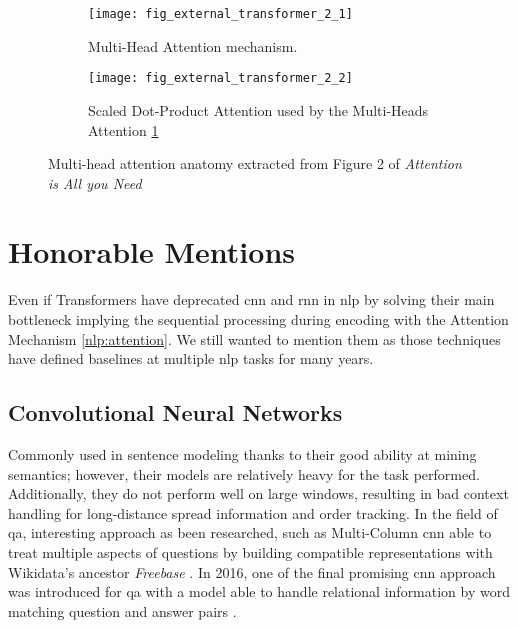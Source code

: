 \begin{figure}
	\begin{subfigure}{.5\textwidth}
		\centering
		\texttt{[image: fig\_external\_transformer\_2\_1]}
		\caption{Multi-Head Attention mechanism.}
		\label{fig:fig_external_transformer_2_1}
	\end{subfigure}
	\hfill
	\begin{subfigure}{.5\textwidth}
		\centering
		\texttt{[image: fig\_external\_transformer\_2\_2]}
    	\caption{Scaled Dot-Product Attention used by the Multi-Heads Attention \ref{fig:fig_external_transformer_2_1}}
    	\label{fig:fig_external_transformer_2_2}
	\end{subfigure}
	\caption{Multi-head attention anatomy extracted from Figure 2 of \textit{Attention is All you Need} \autocite{paper:journals/corr/VaswaniSPUJGKP17}}
	\label{fig:fig_external_transformer_2}
\end{figure}


\section{Honorable Mentions}
Even if Transformers have deprecated \gls{cnn} and \gls{rnn} in \gls{nlp} by solving their main bottleneck implying the sequential processing during encoding with the Attention Mechanism \ref{nlp:attention}. We still wanted to mention them as those techniques have defined baselines at multiple \gls{nlp} tasks for many years.

\subsection{Convolutional Neural Networks}
Commonly used in sentence modeling thanks to their good ability at mining semantics; however, their models are relatively heavy for the task performed. Additionally, they do not perform well on large windows, resulting in bad context handling for long-distance spread information and order tracking. In the field of \gls{qa}, interesting approach as been researched, such as Multi-Column \gls{cnn} \autocite{paper:Dong2015} able to treat multiple aspects of questions by building compatible representations with Wikidata's ancestor \textit{Freebase} \autocite{paper:bollacker2008}. In 2016, one of the final promising \gls{cnn} approach was introduced for \gls{qa} with a model able to handle relational information by word matching question and answer pairs \autocite{paper:Severyn2016}.

